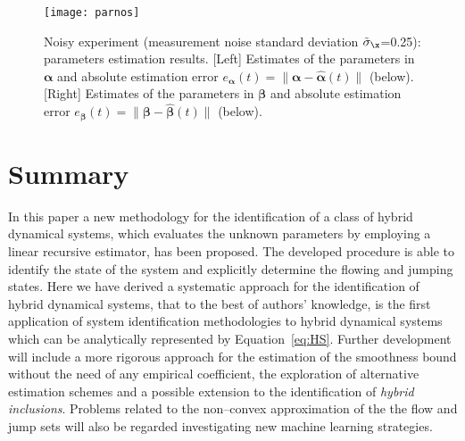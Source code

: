 %
%
\begin{figure}[t!]
	\centering
	\texttt{[image: parnos]}
	\caption{Noisy experiment (measurement noise standard deviation $\tilde{\sigma}_{\x}$=0.25): parameters estimation results. [Left] Estimates of the parameters in $\bm{\alpha}$ and absolute estimation error $e_{\bm{\alpha}}(t)=\|\bm{\alpha}-\hat{\bm{\alpha}}(t)\|$ (below). [Right] Estimates of the parameters in $\bm{\beta}$ and absolute estimation error $e_{\bm{\beta}}(t)=\|\bm{\beta}-\hat{\bm{\beta}}(t)\|$ (below).}
	\label{fig:parnos}
\end{figure}

\clearpage
\section{Summary}\label{conc}
In this paper a new methodology for the identification of a class of hybrid dynamical systems, which evaluates the unknown parameters by employing a linear recursive estimator, has been proposed. The developed procedure is able to identify the state of the system and explicitly determine the flowing and jumping states. 
Here we have derived a systematic approach for the identification of hybrid dynamical systems, that to the best of authors' knowledge, is the first application of system identification methodologies to hybrid dynamical systems which can be analytically represented by Equation~\ref{eq:HS}.
Further development will include a more rigorous approach for the estimation of the smoothness bound without the need of any empirical coefficient, the exploration of alternative estimation schemes and a possible extension to the identification of \textit{hybrid inclusions}. Problems related to the non--convex approximation of the the flow and jump sets will also be regarded investigating new machine learning strategies.
%